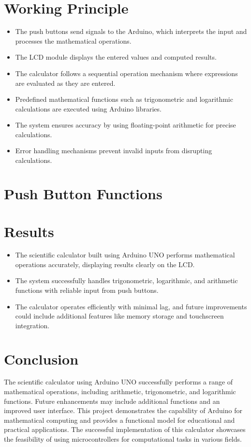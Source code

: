 \documentclass[12pt,a4paper]{article}
\begin{document}
\section{Working Principle}
\begin{itemize}
\item The push buttons send signals to the Arduino, which interprets the input and processes the mathematical operations.
\item The LCD module displays the entered values and computed results.
\item The calculator follows a sequential operation mechanism where expressions are evaluated as they are entered.
\item Predefined mathematical functions such as trigonometric and logarithmic calculations are executed using Arduino libraries.
\item The system ensures accuracy by using floating-point arithmetic for precise calculations.
\item Error handling mechanisms prevent invalid inputs from disrupting calculations.
\end{itemize}
\section{Push Button Functions}

\section{Results}
\begin{itemize}
\item The scientific calculator built using Arduino UNO performs mathematical operations accurately, displaying results clearly on the LCD.
\item The system successfully handles trigonometric, logarithmic, and arithmetic functions with reliable input from push buttons.
\item The calculator operates efficiently with minimal lag, and future improvements could include additional features like memory storage and touchscreen integration.
\end{itemize}
\section{Conclusion}
The scientific calculator using Arduino UNO successfully performs a range of mathematical operations, including arithmetic, trigonometric, and logarithmic functions. Future enhancements may include additional functions and an improved user interface. This project demonstrates the capability of Arduino for mathematical computing and provides a functional model for educational and practical applications. The successful implementation of this calculator showcases the feasibility of using microcontrollers for computational tasks in various fields.
\end{document}

